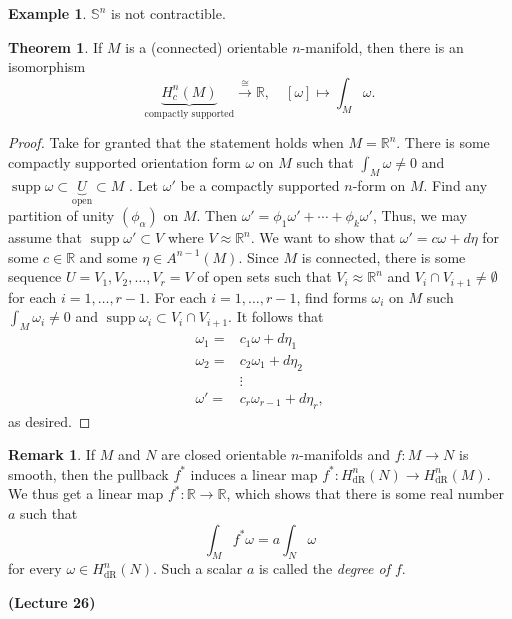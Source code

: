 \documentclass[10pt,letterpaper,cm]{nupset}
\theoremstyle{definition}
\newtheorem{exmp}{Example}
\newtheorem{remark}{Remark}
\newtheorem{theorem}{Theorem}
\newcommand{\R}{\mathbb R}
\renewcommand{\S}{\mathbb S}
\newcommand{\1}{\mathbf{1}}
\newcommand{\0}{\vec 0}
\DeclareMathOperator{\supp}{supp}
\DeclareMathOperator{\dr}{dR}
\begin{document}
\begin{exmp}
$\S^n$ is not contractible.
\end{exmp}

\begin{theorem}
If $M$ is a (connected) orientable $n$-manifold, then there is an isomorphism $$\underbrace{H_c^n(M)}_{\text{compactly supported}} \overset{\cong}{\longrightarrow} \R, \quad [\omega] \mapsto \int_M \omega.$$
\end{theorem}
\begin{proof}
Take for granted that the statement holds when $M = \R^n$. There is some compactly supported orientation form $\omega$ on $M$ such that $\int_M \omega \ne 0$ and $\supp \omega \subset \underbrace{U}_{\text{open}}\subset M$ . Let $\omega'$ be a compactly supported $n$-form on $M$. Find any partition of unity $(\phi_{\alpha})$ on $M$. Then $\omega' =\phi_1\omega' +\cdots + \phi_k \omega'$, Thus, we may assume  that $\supp \omega' \subset V$ where $V \approx \R^n$. We want to show that $\omega' =c\omega + d\eta$ for some $c\in \R$ and some $\eta \in A^{n-1}(M)$. Since $M$ is connected, there is some sequence $U=V_1, V_2, \ldots, V_r=V$ of open sets such that $V_i\approx \R^n$ and $V_i\cap V_{i+1} \ne \emptyset$ for each $i=1, \ldots, r-1$. For each $i=1, \ldots, r-1$, find forms $\omega_i$ on $M$ such $\int_M \omega_i \ne 0$ and $\supp \omega_i \subset V_i \cap V_{i+1}$.  It follows that 
\begin{align*}
 \omega_1  =& c_1\omega + d\eta_1
\\ \omega_2  =& c_2\omega_1+ d\eta_2
\\ & \vdots
\\  \omega'  =&  c_r\omega_{r-1}+d\eta_r
, \end{align*} as desired.
\end{proof}

\begin{remark}
If $M$ and $N$ are closed orientable $n$-manifolds and $f: M \to N$ is smooth, then the pullback $f^{\ast}$ induces a linear map $f^{\ast}: H_{\dr}^n(N) \to H_{\dr}^n(M)$. We thus get a linear map $f^{\ast} : \R \to \R$, which shows that there is some  real number $a$ such that $$\int_{M} f^{\ast} \omega = a\int_N \omega$$ for every $\omega \in H_{\dr}^n(N) $. Such a scalar $a$ is called the \textit{degree of $f$}. 
\end{remark}

\begin{center}
{\textbf{(Lecture 26)}} 
\end{center}
\end{document}
